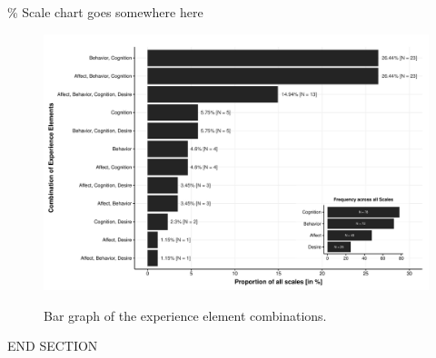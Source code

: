 \% Scale chart goes somewhere here

\begin{figure}[h]
\centering
\caption{Bar graph of the experience element combinations.}
\includegraphics[width=\textwidth]{Figures/ABCDFreq-1}
\label{fig:ElementsScales}
\end{figure}

END SECTION
